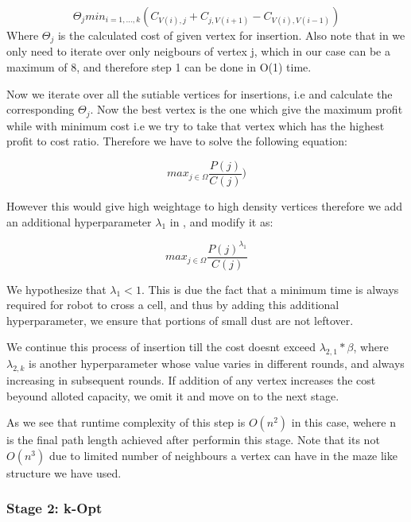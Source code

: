 \documentclass{article}
\begin{document}
\begin{equation} \label{eq2}
    \Theta_{j} min_{i = 1,\dots,k} ( C_{V(i),j} + C_{j,V(i+1)} - C_{V(i),V(i-1)} )
\end{equation}  
Where $\Theta_{j}$ is the calculated cost of given vertex for insertion.
Also note that in  we only need to iterate over only neigbours of vertex j, which in our case can be a maximum of 8, and therefore step 1 can be done in O(1) time.

Now we iterate over all the sutiable vertices for insertions, i.e and calculate the corresponding
$\Theta_{j}$. Now the best vertex is the one which give the maximum profit while with minimum cost i.e we try to take that vertex which has the highest profit to cost ratio.
Therefore we have to solve the following equation:

\begin{equation} \label{eq3}
    max_{j \in \Omega} \frac{P(j)}{C(j)} )
\end{equation}

However this would give high weightage to high density vertices therefore we add an additional hyperparameter $\lambda_1$ in ,
and modify it as:

\begin{equation} \label{eq4}
    max_{j \in \Omega}  \frac{P(j)^{\lambda_{1}}}{C(j)}
\end{equation}

We hypothesize that $\lambda_{1} < 1$. This is due the fact that a minimum time is always required for robot to cross a cell, and thus by adding this additional hyperparameter,
we ensure that portions of small dust are not leftover.

We continue this process of insertion till the cost doesnt exceed $\lambda_{2,1} * \beta$, where $\lambda_{2,k}$ is another hyperparameter whose value varies in different rounds, and always increasing in subsequent rounds. 
If addition of any vertex increases the cost beyound alloted capacity, we omit it and move on to the next stage.

As we see that runtime complexity of this step is $O(n^2)$ in this case, wehere n is the final path length achieved after performin this stage. Note that its not $O(n^3)$ due to limited number of neighbours a vertex can have in the maze like structure we have used.


\subsubsection{Stage 2: k-Opt}
\end{document}
